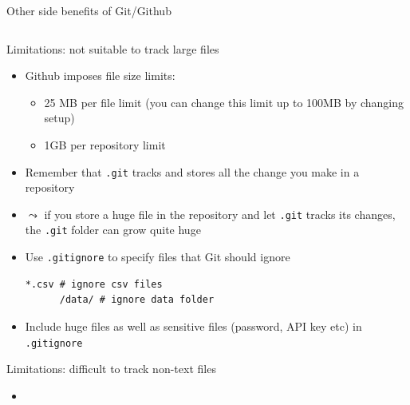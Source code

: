 \documentclass[handout,pdftex,10pt,aspectratio=169]{beamer}
\newcommand{\backupbegin}{
   \newcounter{finalframe}
   \setcounter{finalframe}{\value{framenumber}}
}
\newcommand{\backupend}{
   \setcounter{framenumber}{\value{finalframe}}
}
\begin{document}
\begin{frame}{Other side benefits of Git/Github}
\begin{columns}[c]
\begin{column}{0.53\linewidth}
      \end{column}
  \end{columns}
\end{frame}

\begin{frame}[fragile]{Limitations: not suitable to track large files}
  \begin{itemize}
    \item Github imposes file size limits:
    \begin{itemize}
      \item 25 MB per file limit 
      (you can change this limit up to 100MB by changing setup)
      \item 1GB per repository limit
    \end{itemize}
    \item Remember that \texttt{.git} tracks and stores all the change you make in a repository
    \item[] $\leadsto$ if you store a huge file in the repository and let \texttt{.git} tracks 
    its changes, the \texttt{.git} folder can grow quite huge
    \medskip
    \item Use \texttt{.gitignore} to specify files that Git should ignore
    \begin{Verbatim}[frame=single, label=.gitignore]
      *.csv # ignore csv files
      /data/ # ignore data folder
    \end{Verbatim}
    \item Include huge files as well as sensitive files (password, API key etc) in \texttt{.gitignore}
  \end{itemize}
\end{frame}

\begin{frame}[fragile]{Limitations: difficult to track non-text files}
  \begin{itemize}
    \item 
  \end{itemize}
\end{frame}

\backupbegin
\backupend
\end{document}
